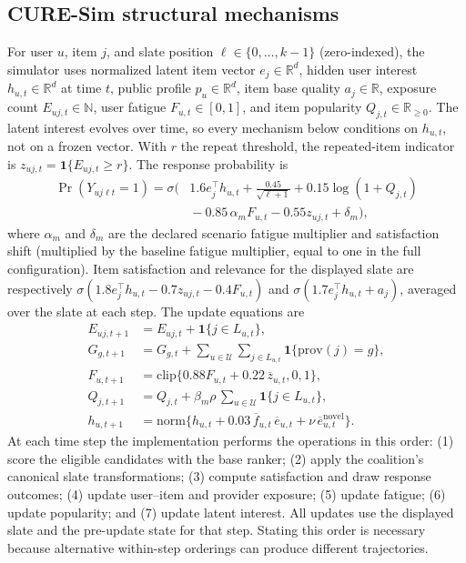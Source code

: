 \documentclass[review]{elsarticle}
\theoremstyle{plain}
\theoremstyle{definition}
\theoremstyle{remark}
\begin{document}
\begin{appendices}
\section{CURE-Sim structural mechanisms}\label{app:scm}
For user $u$, item $j$, and slate position $\ell\in\{0,\ldots,k-1\}$ (zero-indexed), the simulator uses normalized latent item vector $e_j\in\mathbb{R}^d$, hidden user interest $h_{u,t}\in\mathbb{R}^d$ at time $t$, public profile $p_u\in\mathbb{R}^d$, item base quality $a_j\in\mathbb{R}$, exposure count $E_{uj,t}\in\mathbb{N}$, user fatigue $F_{u,t}\in[0,1]$, and item popularity $Q_{j,t}\in\mathbb{R}_{\geq0}$. The latent interest evolves over time, so every mechanism below conditions on $h_{u,t}$, not on a frozen vector. With $r$ the repeat threshold, the repeated-item indicator is $z_{uj,t}=\mathbf{1}\{E_{uj,t}\ge r\}$. The response probability is
\begin{equation}
 \begin{aligned}
 \Pr(Y_{uj\ell t}=1)=\sigma\!\biggl(&1.6 e_j^\top h_{u,t}
 +\frac{0.45}{\sqrt{\ell+1}}+0.15\log(1+Q_{j,t})\\[-2pt]
 &{}-0.85\,\alpha_m F_{u,t}-0.55z_{uj,t}+\delta_m\biggr),
 \end{aligned}
\label{eq:response}
\end{equation}
where $\alpha_m$ and $\delta_m$ are the declared scenario fatigue multiplier and satisfaction shift (multiplied by the baseline fatigue multiplier, equal to one in the full configuration). Item satisfaction and relevance for the displayed slate are respectively $\sigma(1.8e_j^\top h_{u,t}-0.7z_{uj,t}-0.4F_{u,t})$ and $\sigma(1.7e_j^\top h_{u,t}+a_j)$, averaged over the slate at each step. The update equations are
\begin{align}
 E_{uj,t+1}&=E_{uj,t}+\mathbf{1}\{j\in L_{u,t}\},\label{eq:exposure}\\
 G_{g,t+1}&=G_{g,t}+\sum_{u\in\mathcal U}\sum_{j\in L_{u,t}}\mathbf{1}\{\mathrm{prov}(j)=g\},\label{eq:provider-exposure}\\
 F_{u,t+1}&=\mathrm{clip}\{0.88F_{u,t}+0.22\,\overline z_{u,t},0,1\},\label{eq:fatigue-update}\\
 Q_{j,t+1}&=Q_{j,t}+\beta_m\rho\,\sum_{u\in\mathcal U}\mathbf{1}\{j\in L_{u,t}\},\label{eq:popularity}\\
 h_{u,t+1}&=\mathrm{norm}\{h_{u,t}+0.03\,\overline f_{u,t}\,\overline e_{u,t}+\nu\,\overline e^{\mathrm{novel}}_{u,t}\}.\label{eq:interest}
\end{align}
At each time step the implementation performs the operations in this order: (1) score the eligible candidates with the base ranker; (2) apply the coalition's canonical slate transformations; (3) compute satisfaction and draw response outcomes; (4) update user--item and provider exposure; (5) update fatigue; (6) update popularity; and (7) update latent interest. All updates use the displayed slate and the pre-update state for that step. Stating this order is necessary because alternative within-step orderings can produce different trajectories.


\end{appendices}
\end{document}
